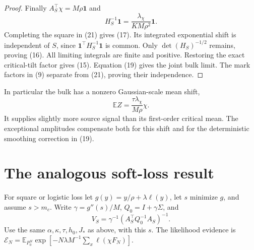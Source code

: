 \documentclass[11pt]{article}
\newcommand{\E}{\mathbb E}\newcommand{\R}{\mathbb R}
\newcommand{\one}{\mathbf1}\newcommand{\TV}{\mathrm{TV}}
\begin{document}
\begin{proof}
Finally $A_S^\top\chi=M\rho\one$ and
\[
 H_S^{-1}\one=\frac{\lambda_\chi}{KM\rho^2}\one.
\]
Completing the square in (21) gives (17). Its integrated exponential
shift is independent of $S$, since $\one^\top H_S^{-1}\one$ is common.
Only $\det(H_S)^{-1/2}$ remains, proving (16). All limiting integrals
are finite and positive. Restoring the exact critical-tilt factor gives
(15). Equation (19) gives the joint bulk limit. The mark factors in (9)
separate from (21), proving their independence.
\end{proof}

In particular the bulk has a nonzero Gaussian-scale mean shift,
\[
                   \E Z=\frac{\tau\lambda_\chi}{M\rho}\chi. \tag{22}
\]
It supplies slightly more source signal than its first-order critical
mean. The exceptional amplitudes compensate both for this shift and for
the deterministic smoothing correction in (19).

\section{The analogous soft-loss result}
For square or logistic loss let
$g(y)=y/\rho+\lambda\ell(y)$, let $s$ minimize $g$, and assume $s>m_c$.
Write $\gamma=g''(s)/M$, $Q_0=I+\gamma\Sigma$, and
\[
 V_S=\gamma^{-1}(A_S^\top Q_0^{-1}A_S)^{-1}.
\]
Use the same $\alpha,\kappa,\tau,h_0,J_*$ as above, with this $s$.
The likelihood evidence is
$\mathcal E_N=\E_{P_0^N}\exp[-N\lambda M^{-1}\sum_x\ell(\chi F_N)]$.
\end{document}
